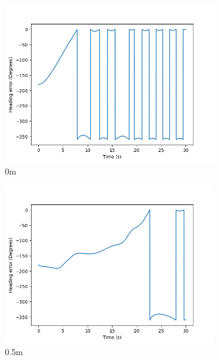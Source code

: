 \documentclass[class=article, crop=false]{standalone}
\begin{document}
\begin{figure}
    \centering
    \begin{subfigure}[b]{0.48\textwidth}
        \centering
        \includegraphics{scenario1/rov-50m/0.0m/usv_heading_error_controlled}
        \caption{0m}
        \label{}
    \end{subfigure}
    \hfill
    \begin{subfigure}[b]{0.48\textwidth}
        \centering
        \includegraphics{scenario1/rov-50m/0.5m/usv_heading_error_controlled}
        \caption{0.5m}
        \label{}
    \end{subfigure}
    \vfill
    \begin{subfigure}[b]{0.48\textwidth}
        \centering

\end{subfigure}
\end{figure}
\end{document}
